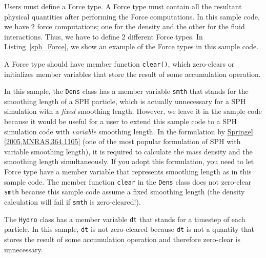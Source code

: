 Users must define a \textsf{Force} type. A \textsf{Force} type must contain all the resultant physical quantities after performing the Force computations. In this sample code, we have 2 force computations; one for the density and the other for the fluid interactions. Thus, we have to define 2 different \textsf{Force} types. In Listing~\ref{sph_Force}, we show an example of the \textsf{Force} types in this sample code.

\ifCpp %

\endifCpp
\ifFtn %

\endifFtn
\ifC %

\endifC

\ifCpp %
A \textsf{Force} type should have member function \texttt{clear()}, which zero-clears or initializes member variables that store the result of some accumulation operation.

In this sample, the \texttt{Dens} class has a member variable \texttt{smth} that stands for the smoothing length of a SPH particle, which is actually unnecessary for a SPH simulation with a \textit{fixed} smoothing length. However, we leave it in the sample code because it would be useful for a user to extend this sample code to a SPH simulation code with \textit{variable} smoothing length. In the formulation by \href{http://mnras.oxfordjournals.org/content/364/4/1105}{Springel [2005,MNRAS,364,1105]} (one of the most popular formulation of SPH with variable smoothing length), it is required to calculate the mass density and the smoothing length simultaneously. If you adopt this formulation, you need to let \textsf{Force} type have a member variable that represents smoothing length as in this sample code. The member function \texttt{clear} in the \texttt{Dens} class does not zero-clear \texttt{smth} because this sample code assume a fixed smoothing length (the density calculation will fail if \texttt{smth} is zero-cleared!).

The \texttt{Hydro} class has a member variable \texttt{dt} that stands for a timestep of each particle. In this sample, \texttt{dt} is not zero-cleared because \texttt{dt} is not a quantity that stores the result of some accumulation operation and  therefore zero-clear is unnecessary.
\endifCpp

